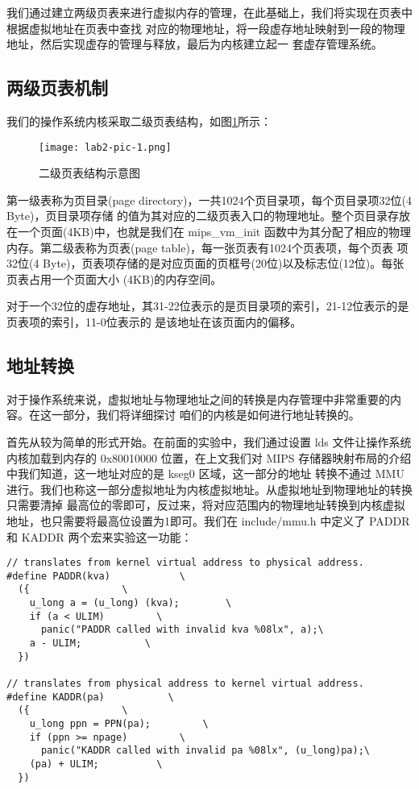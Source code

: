 我们通过建立两级页表来进行虚拟内存的管理，在此基础上，我们将实现在页表中根据虚拟地址在页表中查找
对应的物理地址，将一段虚存地址映射到一段的物理地址，然后实现虚存的管理与释放，最后为内核建立起一
套虚存管理系统。

\subsection{两级页表机制}

我们的操作系统内核采取二级页表结构，如图\ref{lab2-pic-1.png}所示：

\begin{figure}[htbp]
  \centering
  \texttt{[image: lab2-pic-1.png]}
  \caption{二级页表结构示意图}\label{lab2-pic-1.png}
\end{figure}

第一级表称为页目录(page directory)，一共1024个页目录项，每个页目录项32位(4 Byte)，页目录项存储
的值为其对应的二级页表入口的物理地址。整个页目录存放在一个页面(4KB)中，也就是我们在 mips\_vm\_init 
函数中为其分配了相应的物理内存。第二级表称为页表(page table)，每一张页表有1024个页表项，每个页表
项32位(4 Byte)，页表项存储的是对应页面的页框号(20位)以及标志位(12位)。每张页表占用一个页面大小
(4KB)的内存空间。

对于一个32位的虚存地址，其31-22位表示的是页目录项的索引，21-12位表示的是页表项的索引，11-0位表示的
是该地址在该页面内的偏移。

\subsection{地址转换}

对于操作系统来说，虚拟地址与物理地址之间的转换是内存管理中非常重要的内容。在这一部分，我们将详细探讨
咱们的内核是如何进行地址转换的。

首先从较为简单的形式开始。在前面的实验中，我们通过设置 lds 文件让操作系统内核加载到内存的 0x80010000 
位置，在上文我们对 MIPS 存储器映射布局的介绍中我们知道，这一地址对应的是 kseg0 区域，这一部分的地址
转换不通过 MMU 进行。我们也称这一部分虚拟地址为内核虚拟地址。从虚拟地址到物理地址的转换只需要清掉
最高位的零即可，反过来，将对应范围内的物理地址转换到内核虚拟地址，也只需要将最高位设置为1即可。我们在
 include/mmu.h 中定义了 PADDR 和 KADDR 两个宏来实验这一功能：

\begin{verbatim}
// translates from kernel virtual address to physical address.
#define PADDR(kva)            \
  ({                \
    u_long a = (u_long) (kva);        \
    if (a < ULIM)         \
      panic("PADDR called with invalid kva %08lx", a);\
    a - ULIM;           \
  })

// translates from physical address to kernel virtual address.
#define KADDR(pa)           \
  ({                \
    u_long ppn = PPN(pa);         \
    if (ppn >= npage)         \
      panic("KADDR called with invalid pa %08lx", (u_long)pa);\
    (pa) + ULIM;          \
  })
\end{verbatim}

